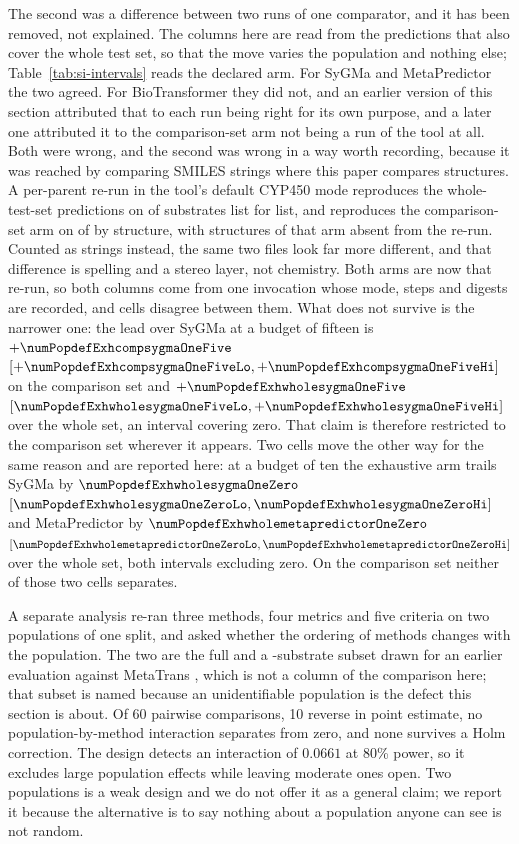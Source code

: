 \documentclass[journal=jcisd8,manuscript=suppinfo,layout=onecolumn]{achemso}
\begin{document}
The second was a difference between two runs of one comparator, and it has been removed,
not explained. The columns here are read from the predictions that also cover the whole test set,
so that the move varies the population and nothing else; Table~\ref{tab:si-intervals} reads the
declared arm. For SyGMa and MetaPredictor the two agreed. For BioTransformer they did not, and an
earlier version of this section attributed that to each run being right for its own purpose, and a
later one attributed it to the comparison-set arm not being a run of the tool at all. Both were
wrong, and the second was wrong in a way worth recording, because it was reached by comparing
SMILES strings where this paper compares structures. A per-parent re-run in the tool's default
CYP450 mode reproduces the whole-test-set predictions on \numBtstepsWholeIdentical{} of
\numBtstepsWholeShared{} substrates list for list, and reproduces the comparison-set arm on
\numBtstepsCompSetidentical{} of \numBtstepsCompShared{} by structure, with
\numBtstepsCompOrphans{} structures of that arm absent from the re-run. Counted as strings
instead, the same two files look far more different, and that difference is spelling and a stereo
layer, not chemistry. Both arms are now that re-run, so both columns come from one
invocation whose mode, steps and digests are recorded, and
\numSTwoNineBtdisagreements{} cells disagree between them. What does not survive is the
narrower one: the lead over SyGMa at a budget of fifteen is
$+\numPopdefExhcompsygmaOneFive$ $[+\numPopdefExhcompsygmaOneFiveLo,
+\numPopdefExhcompsygmaOneFiveHi]$ on the comparison set and
$+\numPopdefExhwholesygmaOneFive$ $[\numPopdefExhwholesygmaOneFiveLo,
+\numPopdefExhwholesygmaOneFiveHi]$ over the whole set, an interval covering zero. That claim is
therefore restricted to the comparison set wherever it appears. Two cells move the other way for
the same reason and are reported here: at a budget of ten the exhaustive
arm trails SyGMa by $\numPopdefExhwholesygmaOneZero$ $[\numPopdefExhwholesygmaOneZeroLo,
\numPopdefExhwholesygmaOneZeroHi]$ and MetaPredictor by
$\numPopdefExhwholemetapredictorOneZero$ $[\numPopdefExhwholemetapredictorOneZeroLo,
\numPopdefExhwholemetapredictorOneZeroHi]$ over the whole set, both intervals excluding zero.
On the comparison set neither of those two cells separates.

A separate analysis re-ran three
methods, four metrics and five criteria on two populations of one split, and asked whether the
ordering of methods changes with the population. The two are the full \numPopulationTestsubs{}
and a \numBtN{}-substrate subset drawn for an earlier evaluation against MetaTrans
\citep{Litsa_2020}, which is not a column of the comparison here; that subset is named because an
unidentifiable population is the defect this section is about. Of 60 pairwise comparisons, 10
reverse in point estimate,
no population-by-method interaction separates from zero, and none survives a Holm correction. The
design detects an interaction of $0.0661$ at 80\% power, so it excludes large population effects
while leaving moderate ones open. Two populations is a weak design and we do not offer it as a
general claim; we report it because the alternative is to say nothing about a population anyone
can see is not random.
\end{document}
